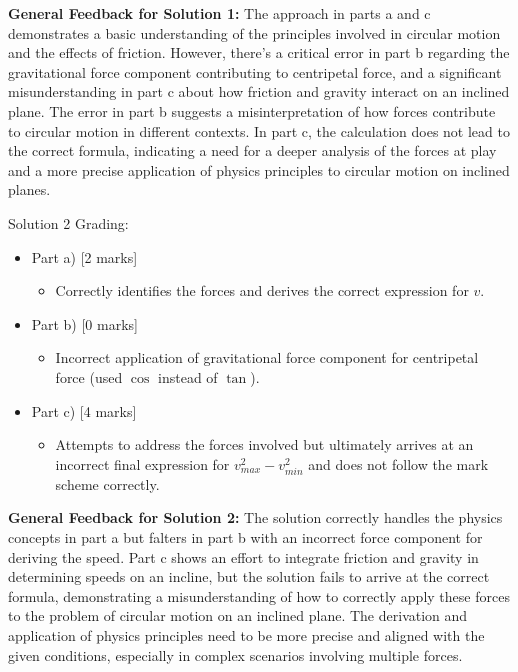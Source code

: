 \documentclass[a4paper,11pt]{article}
\begin{document}
\textbf{General Feedback for Solution 1:}
The approach in parts a and c demonstrates a basic understanding of the principles involved in circular motion and the effects of friction. However, there's a critical error in part b regarding the gravitational force component contributing to centripetal force, and a significant misunderstanding in part c about how friction and gravity interact on an inclined plane. The error in part b suggests a misinterpretation of how forces contribute to circular motion in different contexts. In part c, the calculation does not lead to the correct formula, indicating a need for a deeper analysis of the forces at play and a more precise application of physics principles to circular motion on inclined planes.

Solution 2 Grading:

\begin{itemize}
    \item Part a) [2 marks]
    \begin{itemize}
        \item Correctly identifies the forces and derives the correct expression for \(v\).
    \end{itemize}
    \item Part b) [0 marks]
    \begin{itemize}
        \item Incorrect application of gravitational force component for centripetal force (used \( \cos \) instead of \( \tan \)).
    \end{itemize}
    \item Part c) [4 marks]
    \begin{itemize}
        \item Attempts to address the forces involved but ultimately arrives at an incorrect final expression for \( v_{max}^2 - v_{min}^2 \) and does not follow the mark scheme correctly.
    \end{itemize}
\end{itemize}

\textbf{General Feedback for Solution 2:}
The solution correctly handles the physics concepts in part a but falters in part b with an incorrect force component for deriving the speed. Part c shows an effort to integrate friction and gravity in determining speeds on an incline, but the solution fails to arrive at the correct formula, demonstrating a misunderstanding of how to correctly apply these forces to the problem of circular motion on an inclined plane. The derivation and application of physics principles need to be more precise and aligned with the given conditions, especially in complex scenarios involving multiple forces.
\end{document}
